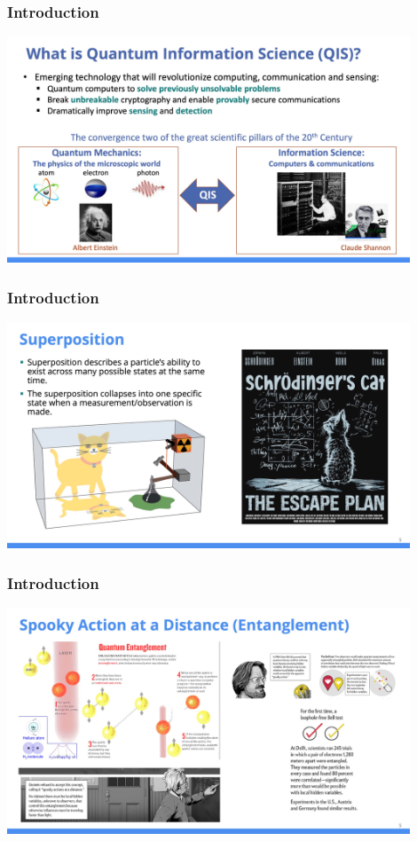 \documentclass{beamer}
\begin{document}
\begin{frame}\frametitle{Introduction}
\begin{center}
\includegraphics[width=12cm]{fig/Slide4.jpeg}
\end{center}
\end{frame}

\begin{frame}\frametitle{Introduction}
\begin{center}
\includegraphics[width=12cm]{fig/supercat.jpg}
\end{center}
\end{frame}

\begin{frame}\frametitle{Introduction}
\begin{center}
\includegraphics[width=12cm]{fig/Slide5.jpeg}
\end{center}
\end{frame}
\end{document}
